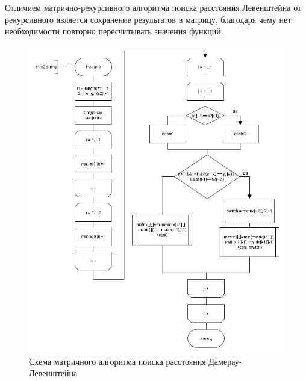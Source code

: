 Отличием матрично-рекурсивного алгоритма поиска расстояния Левенштейна от рекурсивного является сохранение результатов в матрицу, благодаря чему нет необходимости повторно пересчитывать значения функций.
\begin{figure}
	\centering
	\includegraphics[width=0.8\linewidth]{src/Damerau_m}
	\caption{Схема матричного алгоритма поиска расстояния Дамерау-Левенштейна}
	\label{fig:dameraum}
\end{figure}
